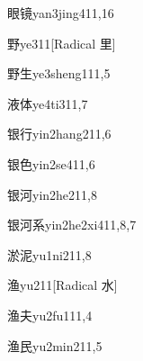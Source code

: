 \begin{verbete}{眼镜}{yan3jing4}{11,16}
\end{verbete}

\begin{verbete}{野}{ye3}{11}[Radical 里]
\end{verbete}

\begin{verbete}{野生}{ye3sheng1}{11,5}
\end{verbete}

\begin{verbete}{液体}{ye4ti3}{11,7}
\end{verbete}

\begin{verbete}{银行}{yin2hang2}{11,6}
\end{verbete}

\begin{verbete}{银色}{yin2se4}{11,6}
\end{verbete}

\begin{verbete}{银河}{yin2he2}{11,8}
\end{verbete}

\begin{verbete}{银河系}{yin2he2xi4}{11,8,7}
\end{verbete}

\begin{verbete}{淤泥}{yu1ni2}{11,8}
\end{verbete}

\begin{verbete}{渔}{yu2}{11}[Radical 水]
\end{verbete}

\begin{verbete}{渔夫}{yu2fu1}{11,4}
\end{verbete}

\begin{verbete}{渔民}{yu2min2}{11,5}
\end{verbete}

